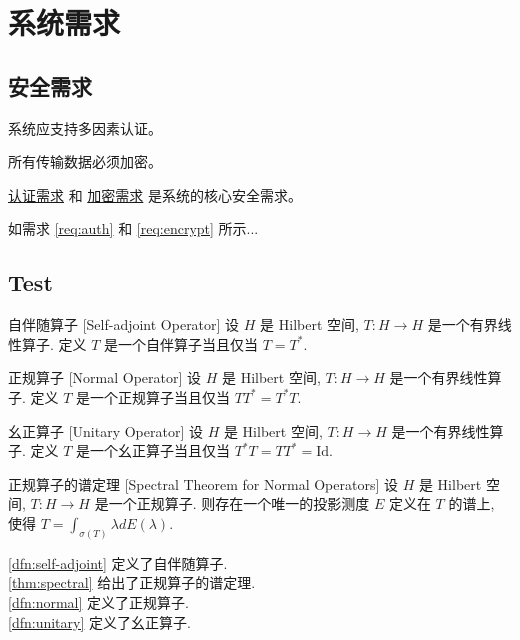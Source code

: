 \documentclass{article}
\newcounter{requirement}[subsection]
\begin{document}
\section{系统需求}
\subsection{安全需求}

\begin{requirement}[用户认证][auth]
系统应支持多因素认证。
\end{requirement}

\begin{requirement}[数据加密][encrypt]
所有传输数据必须加密。
\end{requirement}

\hyperref[req:auth]{认证需求} 和 \hyperref[req:encrypt]{加密需求} 是系统的核心安全需求。

如需求 \ref{req:auth} 和 \ref{req:encrypt} 所示...

\subsection{Test}

\begin{dfn}
    {自伴随算子}
    [Self-adjoint Operator]
    设 $H$ 是 Hilbert 空间, $T: H \to H$ 是一个有界线性算子. 定义 $T$ 是一个自伴算子当且仅当 \(T=T^*\).
\end{dfn}

\begin{dfn}
    [normal]
    {正规算子}
    [Normal Operator]
    设 $H$ 是 Hilbert 空间, $T: H \to H$ 是一个有界线性算子. 定义 $T$ 是一个正规算子当且仅当 \(TT^*=T^*T\).
\end{dfn}

\begin{dfn}
    [unitary]
    {幺正算子}
    [Unitary Operator]
    设 $H$ 是 Hilbert 空间, $T: H \to H$ 是一个有界线性算子. 定义 $T$ 是一个幺正算子当且仅当 \(T^*T=TT^*=\mathrm{Id}\).
\end{dfn}

\begin{thm}
    [spectral]
    {正规算子的谱定理}
    [Spectral Theorem for Normal Operators]
    设 $H$ 是 Hilbert 空间, $T: H \to H$ 是一个正规算子. 则存在一个唯一的投影测度 $E$ 定义在 $T$ 的谱上, 使得 \(T=\int_{\sigma(T)} \lambda dE(\lambda)\).
\end{thm}

\ref{dfn:self-adjoint} 定义了自伴随算子. \\
\ref{thm:spectral} 给出了正规算子的谱定理. \\
\ref{dfn:normal} 定义了正规算子. \\
\ref{dfn:unitary} 定义了幺正算子. \\
\end{document}
